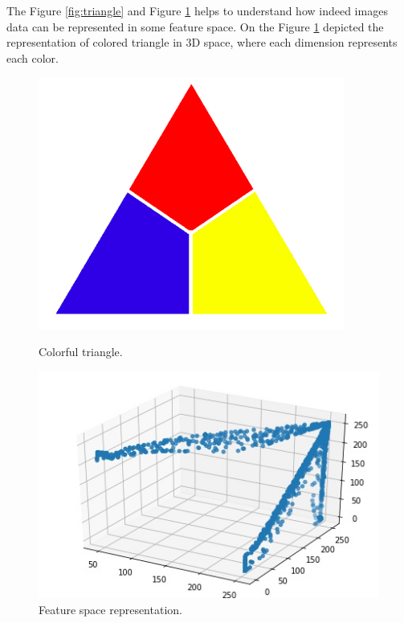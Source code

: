 The Figure \ref{fig:triangle} and Figure \ref{fig:clustering} helps to understand how indeed images data can be represented in some feature space. On the Figure  \ref{fig:clustering} depicted the representation of colored triangle in 3D space, where each dimension represents each color.

\begin{figure}[h]
    \centering
    \begin{minipage}[b]{0.4\textwidth}
    \includegraphics[width=\textwidth]{images/k_mean_triangle.png}
    \caption{Colorful triangle.}
    \label{fig:triangle}
    \end{minipage}
    \hfill
    \begin{minipage}[b]{0.4\textwidth}
    \includegraphics[width=\textwidth]{images/k_mean_triangle_clustered.jpg}
    \caption{Feature space representation.}
    \label{fig:clustering}
    \end{minipage}
\end{figure}

